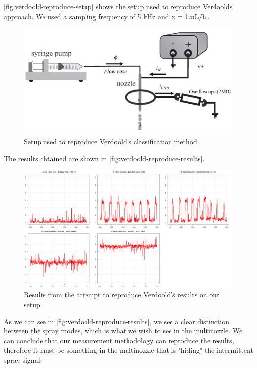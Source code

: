 \documentclass[oneside,12pt]{article}
\begin{document}
\autoref{fig:verdoold-reproduce-setup} shows the setup used to reproduce Verdoolds approach.
We used a sampling frequency of 5 kHz and $\phi = 1 \,\mathrm{mL/h}$. 

\begin{figure}[h!]
    \centering
    \includegraphics[width=.8\textwidth,trim=1 1 1 1,clip]{figures/verdoold-reproduce-setup.png}
    \caption{Setup used to reproduce Verdoold's classification method.}
    \label{fig:verdoold-reproduce-setup}
\end{figure}

The results obtained are shown in \autoref{fig:verdoold-reproduce-results}. 

\begin{figure}[h!]
    \centering
    \includegraphics[width=1\textwidth,trim=1 1 1 1,clip]{figures/verdoold-reproduce-results.png}
    \caption{Results from the attempt to reproduce Verdoold's results on our setup.}
    \label{fig:verdoold-reproduce-results}
\end{figure}

As we can see in \autoref{fig:verdoold-reproduce-results}, we see a clear distinction between the spray modes, 
which is what we wish to see in the multinozzle. We can conclude that our measurement methodology can 
reproduce the results, therefore it must be something in the multinozzle that is "hiding" the intermittent spray 
signal.
\end{document}

